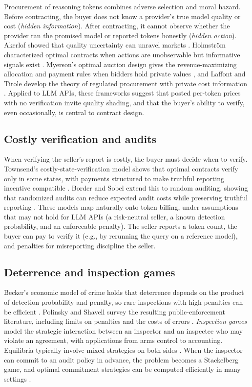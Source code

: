 \documentclass[sigconf]{acmart}
\begin{document}
Procurement of reasoning tokens combines adverse selection and moral hazard. Before contracting, the buyer does not know a provider's true model quality or cost (\emph{hidden information}). After contracting, it cannot observe whether the provider ran the promised model or reported tokens honestly (\emph{hidden action}). Akerlof showed that quality uncertainty can unravel markets \cite{akerlof1970lemons}. Holmstr\"om characterized optimal contracts when actions are unobservable but informative signals exist \cite{holmstrom1979moral}. Myerson's optimal auction design gives the revenue-maximizing allocation and payment rules when bidders hold private values \cite{myerson1981optimal}, and Laffont and Tirole develop the theory of regulated procurement with private cost information \cite{laffont1993procurement}. Applied to LLM APIs, these frameworks suggest that posted per-token prices with no verification invite quality shading, and that the buyer's ability to verify, even occasionally, is central to contract design.

\subsection{Costly verification and audits}\label{costly-verification-and-audits}

When verifying the seller's report is costly, the buyer must decide when to verify. Townsend's costly-state-verification model shows that optimal contracts verify only in some states, with payments structured to make truthful reporting incentive compatible \cite{townsend1979csv}. Border and Sobel extend this to random auditing, showing that randomized audits can reduce expected audit costs while preserving truthful reporting \cite{border1987samurai}. These models map naturally onto token billing, under assumptions that may not hold for LLM APIs (a risk-neutral seller, a known detection probability, and an enforceable penalty). The seller reports a token count, the buyer can pay to verify it (e.g., by rerunning the query on a reference model), and penalties for misreporting discipline the seller.

\subsection{Deterrence and inspection games}\label{deterrence-and-inspection-games}

Becker's economic model of crime holds that deterrence depends on the product of detection probability and penalty, so rare inspections with high penalties can be efficient \cite{becker1968crime}. Polinsky and Shavell survey the resulting public-enforcement literature, including limits on penalties and the costs of errors \cite{polinsky2000enforcement}. \emph{Inspection games} model the strategic interaction between an inspector and an inspectee who may violate an agreement, with applications from arms control to accounting. Equilibria typically involve mixed strategies on both sides \cite{avenhaus2002inspection}. When the inspector can commit to an audit policy in advance, the problem becomes a Stackelberg game, and optimal commitment strategies can be computed efficiently in many settings \cite{conitzer2006commit}.
\end{document}

